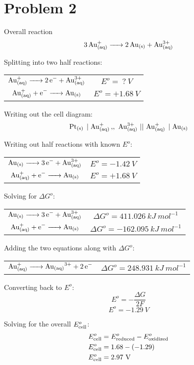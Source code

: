 \documentclass{article}
\begin{document}
\section*{ Problem 2 }
Overall reaction
$$\ce{3Au^+_{(aq)} -> 2Au_{(s)} + Au^{3+}_{(aq)}}$$

Splitting into two half reactions:
\begin{center}
    \begin{tabular}{c c}
        $\ce{Au^+_{(aq)} -> 2e- + Au^{3+}_{(aq)}}$ & $E^o=\ ?\ \si{V}$ \\
        $\ce{Au^+_{(aq)} + e- -> Au_{(s)}}$ & $E^o = +1.68\ \si{V}$
    \end{tabular}
\end{center}

Writing out the cell diagram:
$$\ce{Pt_{(s)} \mid Au^+_{(aq)} ,,\ Au^{3+}_{(aq)}\ \vert \vert\ Au^+_{(aq)} \mid
Au_{(s)}}$$

Writing out half reactions with known $E^o$:
\begin{center}
    \begin{tabular}{c c}
        $\ce{Au_{(s)} -> 3e- + Au^{3+}_{(aq)}}$ & $E^o=-1.42\ \si{V}$ \\
        $\ce{Au^+_{(aq)} + e- -> Au_{(s)}}$ & $E^o = +1.68\ \si{V}$
    \end{tabular}
\end{center}

Solving for $\Delta G^o$:
\begin{center}
    \begin{tabular}{c c}
        $\ce{Au_{(s)} -> 3e- + Au^{3+}_{(aq)}}$ & $\Delta G^o = 411.026\ \si{kJ\
    mol^{-1}}$\\
        $\ce{Au^+_{(aq)} + e- -> Au_{(s)}}$ & $\Delta G^o = -162.095\ \si{kJ\
mol^{-1}}$
    \end{tabular}
\end{center}

Adding the two equations along with $\Delta G^o$:
\begin{center}
    \begin{tabular}{c c}
        $\ce{Au^+_{(aq)} -> Au_{(aq)}^{3+} + 2e-}$ & $\Delta G^o = 248.931\
        \si{kJ\ mol^{-1}}$
    \end{tabular}
\end{center}

Converting back to $E^o$:
$$E^o = -\frac{\Delta G}{2F}$$
$$E^o = -1.29\ \si{V}$$

Solving for the overall $E^o_{\rm{cell}}$:
\begin{align*}
    E^o_{\rm{cell}} &= E^o_{\rm{reduced}} - E^o_{\rm{oxidized}}\\
    E^o_{\rm{cell}} &= 1.68 - (-1.29) \\
    E^o_{\rm{cell}} &= 2.97\ \si{V}
\end{align*}
\end{document}
